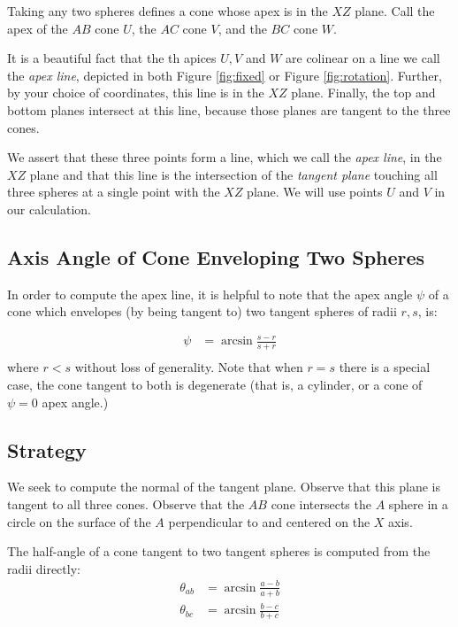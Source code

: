 \documentclass{article}
\begin{document}
Taking any two spheres defines a cone whose apex is in the $XZ$ plane.
Call the apex of the $AB$ cone $U$, the $AC$ cone $V$, and the $BC$ cone $W$.

It is a beautiful fact that the th apices $U,V$ and $W$ are colinear
on a line we call the {\em apex line}, depicted in both Figure \ref{fig:fixed}
or Figure \ref{fig:rotation}.
Further, by your choice of coordinates,
this line is in the $XZ$ plane. Finally, the top and bottom planes
intersect at this line, because those planes are tangent to the three cones.

We assert that these three points form a line, which we call the {\em apex line}, in the $XZ$ plane and that this
line is the intersection of the {\em tangent plane} touching all three spheres at a single point
with the $XZ$ plane. We will use points $U$ and $V$ in our calculation.

\subsection{Axis Angle of Cone Enveloping Two Spheres}

In order to compute the apex line, it is helpful
to note that the apex angle $\psi$ of a cone which envelopes (by being tangent to) two tangent
spheres of radii $r,s$, is:

\begin{align}
 \psi &= \arcsin{\frac{s - r}{s + r}} \\
\end{align}
where $r < s$ without loss of generality. Note that when $r = s$
there is a special case,
the cone tangent to both is degenerate (that is, a cylinder, or a cone of
$\psi = 0$ apex angle.)

\subsection{Strategy}

We seek to compute the normal of the tangent plane.
Observe that this plane is tangent to all three cones.
Observe that the $AB$ cone intersects
the $A$ sphere in a circle on the surface of the $A$ perpendicular to and centered on the $X$ axis.

The half-angle of a cone tangent to two tangent spheres is computed from the radii directly:
\begin{align}
  \theta_{ab} &= \arcsin{\frac{a - b}{a + b}} \label{eq:theta}\\
  \theta_{bc} &= \arcsin{\frac{b - c}{b + c}}
\end{align}
\end{document}
